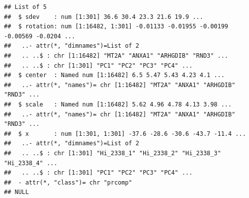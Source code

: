 \documentclass[]{article}
\newenvironment{Shaded}{\begin{snugshade}}{\end{snugshade}}
\newcommand{\KeywordTok}[1]{\textcolor[rgb]{0.13,0.29,0.53}{\textbf{{#1}}}}
\newcommand{\DataTypeTok}[1]{\textcolor[rgb]{0.13,0.29,0.53}{{#1}}}
\newcommand{\DecValTok}[1]{\textcolor[rgb]{0.00,0.00,0.81}{{#1}}}
\newcommand{\StringTok}[1]{\textcolor[rgb]{0.31,0.60,0.02}{{#1}}}
\newcommand{\CommentTok}[1]{\textcolor[rgb]{0.56,0.35,0.01}{\textit{{#1}}}}
\newcommand{\NormalTok}[1]{{#1}}
\numberwithin{figure}{section}
\numberwithin{table}{section}
\theoremstyle{definition}
\theoremstyle{definition}
\theoremstyle{definition}
\theoremstyle{remark}
\begin{document}
\begin{Shaded}
\end{Shaded}

\begin{verbatim}
## List of 5
##  $ sdev    : num [1:301] 36.6 30.4 23.3 21.6 19.9 ...
##  $ rotation: num [1:16482, 1:301] -0.01133 -0.01955 -0.00199 -0.00569 -0.0204 ...
##   ..- attr(*, "dimnames")=List of 2
##   .. ..$ : chr [1:16482] "MT2A" "ANXA1" "ARHGDIB" "RND3" ...
##   .. ..$ : chr [1:301] "PC1" "PC2" "PC3" "PC4" ...
##  $ center  : Named num [1:16482] 6.5 5.47 5.43 4.23 4.1 ...
##   ..- attr(*, "names")= chr [1:16482] "MT2A" "ANXA1" "ARHGDIB" "RND3" ...
##  $ scale   : Named num [1:16482] 5.62 4.96 4.78 4.13 3.98 ...
##   ..- attr(*, "names")= chr [1:16482] "MT2A" "ANXA1" "ARHGDIB" "RND3" ...
##  $ x       : num [1:301, 1:301] -37.6 -28.6 -30.6 -43.7 -11.4 ...
##   ..- attr(*, "dimnames")=List of 2
##   .. ..$ : chr [1:301] "Hi_2338_1" "Hi_2338_2" "Hi_2338_3" "Hi_2338_4" ...
##   .. ..$ : chr [1:301] "PC1" "PC2" "PC3" "PC4" ...
##  - attr(*, "class")= chr "prcomp"
## NULL
\end{verbatim}
\end{document}
